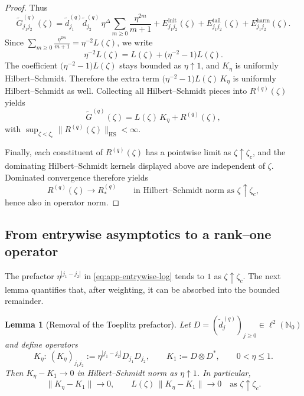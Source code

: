 \documentclass[11pt]{amsart}
\numberwithin{equation}{section}
\theoremstyle{plain}
\newtheorem{lemma}[theorem]{Lemma}
\theoremstyle{definition}
\theoremstyle{remark}
\newcommand{\NN}{\mathbb{N}}
\newcommand{\HS}{\mathrm{HS}}
\begin{document}
\begin{proof}
	Thus
	\[
		\widetilde G^{(q)}_{j_1j_2}(\zeta)
		=
		\widetilde d^{(q)}_{j_1}\widetilde d^{(q)}_{j_2}\,\eta^\Delta
		\sum_{m\ge0}\frac{\eta^{2m}}{m+1}
		+
		E^{\mathrm{init}}_{j_1j_2}(\zeta)
		+
		E^{\mathrm{tail}}_{j_1j_2}(\zeta)
		+
		E^{\mathrm{harm}}_{j_1j_2}(\zeta).
	\]
	Since \(\sum_{m\ge0}\frac{\eta^{2m}}{m+1}=\eta^{-2}L(\zeta)\), we write
	\[
		\eta^{-2}L(\zeta)=L(\zeta)+\bigl(\eta^{-2}-1\bigr)L(\zeta).
	\]
	The coefficient \(\bigl(\eta^{-2}-1\bigr)L(\zeta)\) stays bounded as
\(\eta\uparrow1\), and \(K_\eta\) is uniformly Hilbert--Schmidt. Therefore the
extra term $\bigl(\eta^{-2}-1\bigr)L(\zeta)\,K_\eta$
is uniformly Hilbert--Schmidt as well. Collecting all Hilbert--Schmidt pieces
into \(R^{(q)}(\zeta)\) yields
\[
    \widetilde G^{(q)}(\zeta)=L(\zeta)\,K_\eta+R^{(q)}(\zeta),
\]
with \(\sup_{\zeta<\zeta_c}\|R^{(q)}(\zeta)\|_{\HS}<\infty\).

 Finally, each constituent of \(R^{(q)}(\zeta)\) has a pointwise
	limit as \(\zeta\uparrow\zeta_c\), and the dominating Hilbert--Schmidt kernels
	displayed above are independent of \(\zeta\).  Dominated convergence therefore
	yields
	\[
	 R^{(q)}(\zeta)\to R_*^{(q)}
		\qquad\text{in Hilbert--Schmidt norm as }\zeta\uparrow\zeta_c,
	\]
	hence also in operator norm.
\end{proof}

\subsection{From entrywise asymptotics to a rank--one operator}

The prefactor $\eta^{|j_1-j_2|}$ in \eqref{eq:app-entrywise-log} tends to $1$ as
$\zeta\uparrow\zeta_c$.  The next lemma quantifies that, after weighting, it can
be absorbed into the bounded remainder.
\begin{lemma}[Removal of the Toeplitz prefactor]\label{lem:toeplitz-removal}
	Let $D=(\widetilde d^{(q)}_j)_{j\ge0}\in\ell^2(\NN_0)$ and define operators
	\[
		K_\eta:\ (K_\eta)_{j_1j_2}:=\eta^{|j_1-j_2|}D_{j_1}D_{j_2},
		\qquad
		K_1:=D\otimes D^*,
		\qquad 0<\eta\le1.
	\]
	Then \(K_\eta-K_1\to0\) in Hilbert--Schmidt norm as \(\eta\uparrow1\).
	In particular,
	\[
		\|K_\eta-K_1\|\to0,
		\qquad
		L(\zeta)\,\|K_\eta-K_1\|\to0
		\quad\text{as }\zeta\uparrow\zeta_c.
	\]
\end{lemma}
\end{document}
